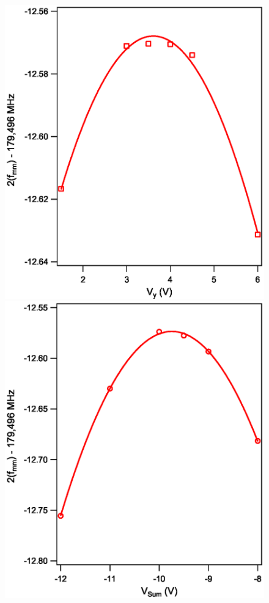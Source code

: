 \documentclass[landscape]{sciposter}
\begin{document}
\begin{multicols}{4}
\begin{figure}
\begin{center}
\includegraphics[scale = 0.65]{33d52_Vy.eps}
\includegraphics[scale = 0.65]{33d52_VSum.eps}
\end{center}
\end{figure}


\end{multicols}
\end{document}
